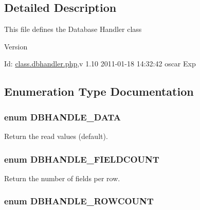 \subsection{Detailed Description}
This file defines the Database Handler class \begin{DoxyVersion}{Version}

\end{DoxyVersion}
\begin{DoxyParagraph}{Id:}
\hyperlink{class_8dbhandler_8php}{class.dbhandler.php},v 1.10 2011-\/01-\/18 14:32:42 oscar Exp 
\end{DoxyParagraph}


\subsection{Enumeration Type Documentation}
\subsubsection[{DBHANDLE\_\-DATA}]{\setlength{\rightskip}{0pt plus 5cm}enum {\bf DBHANDLE\_\-DATA}}\label{class_8dbhandler_8php_acc5178c2a582eafa4ef488ed3394b725}


Return the read values (default). 

\subsubsection[{DBHANDLE\_\-FIELDCOUNT}]{\setlength{\rightskip}{0pt plus 5cm}enum {\bf DBHANDLE\_\-FIELDCOUNT}}\label{class_8dbhandler_8php_afda554c4527b03446f287291626c12ad}


Return the number of fields per row. 

\subsubsection[{DBHANDLE\_\-ROWCOUNT}]{\setlength{\rightskip}{0pt plus 5cm}enum {\bf DBHANDLE\_\-ROWCOUNT}}\label{class_8dbhandler_8php_ac904f05455a162c07c216c330ad7c5c6}


